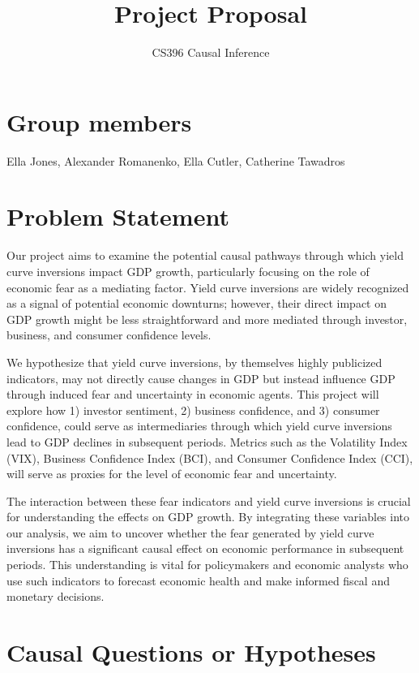 \documentclass[11pt]{article}
\title{Project Proposal \vspace{-1em}}
\author{CS396 Causal Inference}
\begin{document}
\maketitle

\section{Group members}

Ella Jones, Alexander Romanenko, Ella Cutler, Catherine Tawadros

\section{Problem Statement}

Our project aims to examine the potential causal pathways through which yield curve inversions impact GDP growth, particularly focusing on the role of economic fear as a mediating factor. Yield curve inversions are widely recognized as a signal of potential economic downturns; however, their direct impact on GDP growth might be less straightforward and more mediated through investor, business, and consumer confidence levels.

We hypothesize that yield curve inversions, by themselves highly publicized indicators, may not directly cause changes in GDP but instead influence GDP through induced fear and uncertainty in economic agents. This project will explore how 1) investor sentiment, 2) business confidence, and 3) consumer confidence, could serve as intermediaries through which yield curve inversions lead to GDP declines in subsequent periods. Metrics such as the Volatility Index (VIX), Business Confidence Index (BCI), and Consumer Confidence Index (CCI), will serve as proxies for the level of economic fear and uncertainty.

The interaction between these fear indicators and yield curve inversions is crucial for understanding the effects on GDP growth. By integrating these variables into our analysis, we aim to uncover whether the fear generated by yield curve inversions has a significant causal effect on economic performance in subsequent periods. This understanding is vital for policymakers and economic analysts who use such indicators to forecast economic health and make informed fiscal and monetary decisions.

\section{Causal Questions or Hypotheses}
\end{document}
